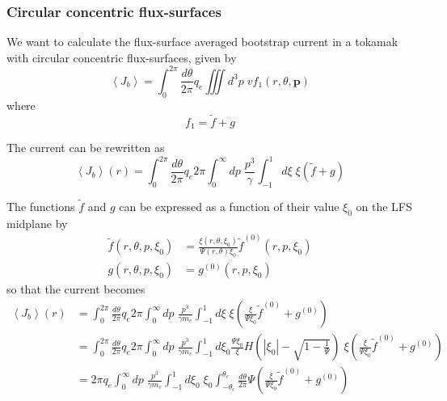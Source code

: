 
\subsubsection{Circular concentric flux-surfaces}

We want to calculate the flux-surface averaged bootstrap current in a tokamak
with circular concentric flux-surfaces, given by
\begin{equation}
\left\langle J_{b}\right\rangle =\int_{0}^{2\pi}\frac{d\theta}{2\pi}%
q_{e}\iiint d^{3}p\;vf_{1}\left(  r,\theta,\mathbf{p}\right)
\end{equation}
where%
\begin{equation}
f_{1}=\widetilde{f}+g
\end{equation}

The current can be rewritten as%
\begin{equation}
\left\langle J_{b}\right\rangle \left(  r\right)  =\int_{0}^{2\pi}%
\frac{d\theta}{2\pi}q_{e}2\pi\int_{0}^{\infty}dp\;\frac{p^{3}}{\gamma}%
\int_{-1}^{1}d\xi\;\xi\left(  \widetilde{f}+g\right)  \label{jb}%
\end{equation}

The functions $\widetilde{f}$ and $g$ can be expressed as a function of their
value $\xi_{0}$ on the LFS midplane by%
\begin{align}
\widetilde{f}\left(  r,\theta,p,\xi_{0}\right)   &  =\frac{\xi\left(
r,\theta,\xi_{0}\right)  }{\Psi\left(  r,\theta\right)  \xi_{0}}\widetilde
{f}^{\left(  0\right)  }\left(  r,p,\xi_{0}\right) \label{fg}\\
g\left(  r,\theta,p,\xi_{0}\right)   &  =g^{\left(  0\right)  }\left(
r,p,\xi_{0}\right) \nonumber
\end{align}
so that the current becomes%
\begin{align}
\left\langle J_{b}\right\rangle \left(  r\right)   &  =\int_{0}^{2\pi}%
\frac{d\theta}{2\pi}q_{e}2\pi\int_{0}^{\infty}dp\;\frac{p^{3}}{\gamma m_{e}%
}\int_{-1}^{1}d\xi\;\xi\left(  \frac{\xi}{\Psi\xi_{0}}\widetilde{f}^{\left(
0\right)  }+g^{\left(  0\right)  }\right) \nonumber\\
&  =\int_{0}^{2\pi}\frac{d\theta}{2\pi}q_{e}2\pi\int_{0}^{\infty}%
dp\;\frac{p^{3}}{\gamma m_{e}}\int_{-1}^{1}d\xi_{0}\frac{\Psi\xi_{0}}{\xi
}H\left(  \left|  \xi_{0}\right|  -\sqrt{1-\frac{1}{\Psi}}\right)
\;\xi\left(  \frac{\xi}{\Psi\xi_{0}}\widetilde{f}^{\left(  0\right)
}+g^{\left(  0\right)  }\right) \nonumber\\
&  =2\pi q_{e}\int_{0}^{\infty}dp\;\frac{p^{3}}{\gamma m_{e}}\int_{-1}^{1}%
d\xi_{0}\;\xi_{0}\int_{-\theta_{c}}^{\theta_{c}}\frac{d\theta}{2\pi}%
\Psi\left(  \frac{\xi}{\Psi\xi_{0}}\widetilde{f}^{\left(  0\right)
}+g^{\left(  0\right)  }\right)  \label{jb1}%
\end{align}

